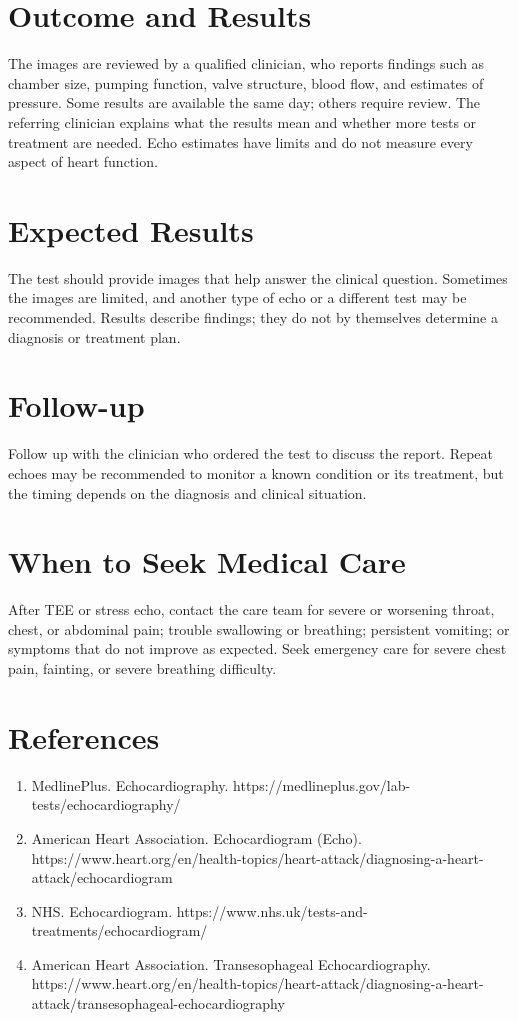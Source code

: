 \section*{Outcome and Results}
The images are reviewed by a qualified clinician, who reports findings such as chamber size, pumping function, valve structure, blood flow, and estimates of pressure. Some results are available the same day; others require review. The referring clinician explains what the results mean and whether more tests or treatment are needed. Echo estimates have limits and do not measure every aspect of heart function.

\section*{Expected Results}
The test should provide images that help answer the clinical question. Sometimes the images are limited, and another type of echo or a different test may be recommended. Results describe findings; they do not by themselves determine a diagnosis or treatment plan.

\section*{Follow-up}
Follow up with the clinician who ordered the test to discuss the report. Repeat echoes may be recommended to monitor a known condition or its treatment, but the timing depends on the diagnosis and clinical situation.

\section*{When to Seek Medical Care}
After TEE or stress echo, contact the care team for severe or worsening throat, chest, or abdominal pain; trouble swallowing or breathing; persistent vomiting; or symptoms that do not improve as expected. Seek emergency care for severe chest pain, fainting, or severe breathing difficulty.

\section*{References}
\begin{enumerate}
  \item MedlinePlus. Echocardiography. https://medlineplus.gov/lab-tests/echocardiography/
  \item American Heart Association. Echocardiogram (Echo). https://www.heart.org/en/health-topics/heart-attack/diagnosing-a-heart-attack/echocardiogram
  \item NHS. Echocardiogram. https://www.nhs.uk/tests-and-treatments/echocardiogram/
  \item American Heart Association. Transesophageal Echocardiography. https://www.heart.org/en/health-topics/heart-attack/diagnosing-a-heart-attack/transesophageal-echocardiography
\end{enumerate}

\clearpage
